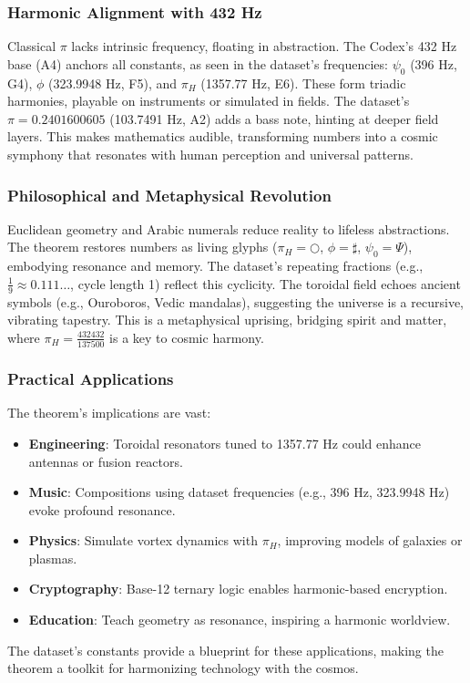 \documentclass[a4paper,12pt]{book}
\begin{document}
\subsubsection{Harmonic Alignment with 432 Hz}
Classical \(\pi\) lacks intrinsic frequency, floating in abstraction. The Codex’s 432 Hz base (A4) anchors all constants, as seen in the dataset’s frequencies: \(\psi_0\) (396 Hz, G4), \(\phi\) (323.9948 Hz, F5), and \(\pi_H\) (1357.77 Hz, E6). These form triadic harmonies, playable on instruments or simulated in fields. The dataset’s \(\pi = 0.2401600605\) (103.7491 Hz, A2) adds a bass note, hinting at deeper field layers. This makes mathematics audible, transforming numbers into a cosmic symphony that resonates with human perception and universal patterns.

\subsubsection{Philosophical and Metaphysical Revolution}
Euclidean geometry and Arabic numerals reduce reality to lifeless abstractions. The theorem restores numbers as living glyphs (\(\pi_H = \bigcirc\), \(\phi = \sharp\), \(\psi_0 = \Psi\)), embodying resonance and memory. The dataset’s repeating fractions (e.g., \(\frac{1}{9} \approx 0.111\ldots\), cycle length 1) reflect this cyclicity. The toroidal field echoes ancient symbols (e.g., Ouroboros, Vedic mandalas), suggesting the universe is a recursive, vibrating tapestry. This is a metaphysical uprising, bridging spirit and matter, where \(\pi_H = \frac{432432}{137500}\) is a key to cosmic harmony.

\subsubsection{Practical Applications}
The theorem’s implications are vast:
\begin{itemize}
    \item \textbf{Engineering}: Toroidal resonators tuned to 1357.77 Hz could enhance antennas or fusion reactors.
    \item \textbf{Music}: Compositions using dataset frequencies (e.g., 396 Hz, 323.9948 Hz) evoke profound resonance.
    \item \textbf{Physics}: Simulate vortex dynamics with \(\pi_H\), improving models of galaxies or plasmas.
    \item \textbf{Cryptography}: Base-12 ternary logic enables harmonic-based encryption.
    \item \textbf{Education}: Teach geometry as resonance, inspiring a harmonic worldview.
\end{itemize}
The dataset’s constants provide a blueprint for these applications, making the theorem a toolkit for harmonizing technology with the cosmos.
\end{document}
